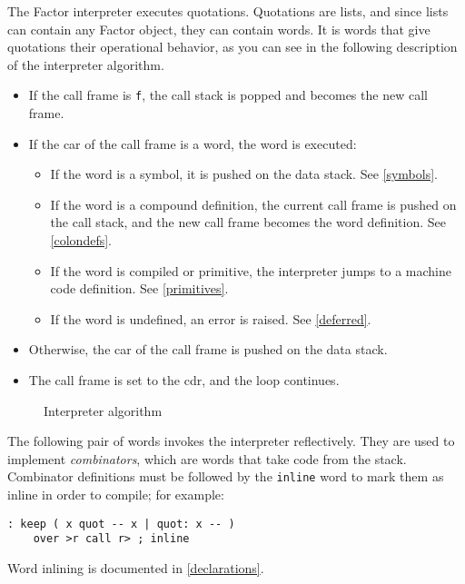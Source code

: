 \documentclass{book}
\begin{document}
The Factor interpreter executes quotations. Quotations are lists, and since lists can contain any Factor object, they can contain words. It is words that give quotations their operational behavior, as you can see in the following description of the interpreter algorithm.

\begin{itemize}
\item If the call frame is \texttt{f}, the call stack is popped and becomes the new call frame.
\item If the car of the call frame is a word, the word is executed:
\begin{itemize}
\item If the word is a symbol, it is pushed on the data stack. See \ref{symbols}.
\item If the word is a compound definition, the current call frame is pushed on the call stack, and the new call frame becomes the word definition. See \ref{colondefs}.
\item If the word is compiled or primitive, the interpreter jumps to a machine code definition. See \ref{primitives}.
\item If the word is undefined, an error is raised. See \ref{deferred}.
\end{itemize}
\item Otherwise, the car of the call frame is pushed on the data stack.
\item The call frame is set to the cdr, and the loop continues.
\end{itemize}

\begin{figure}
\caption{Interpreter algorithm}
\begin{center}
\end{center}
\end{figure}
The following pair of words invokes the interpreter reflectively. They are used to implement \emph{combinators}, which are words that take code from the stack. Combinator definitions must be followed by the \texttt{inline} word to mark them as inline in order to compile; for example:
\begin{verbatim}
: keep ( x quot -- x | quot: x -- )
    over >r call r> ; inline
\end{verbatim}
Word inlining is documented in \ref{declarations}.
\end{document}
